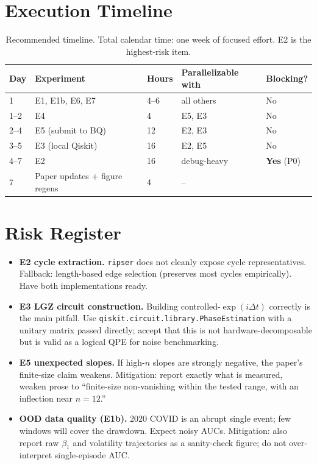 \documentclass[11pt]{article}
\begin{document}
\section{Execution Timeline}

\begin{table}[h]
\centering
\small
\begin{tabular}{lllll}
\toprule
Day & Experiment & Hours & Parallelizable with & Blocking? \\
\midrule
1    & E1, E1b, E6, E7    & 4--6  & all others   & No \\
1--2 & E4                 & 4     & E5, E3       & No \\
2--4 & E5 (submit to BQ)  & 12    & E2, E3       & No \\
3--5 & E3 (local Qiskit)  & 16    & E2, E5       & No \\
4--7 & E2                 & 16    & debug-heavy  & \textbf{Yes} (P0) \\
7    & Paper updates + figure regens & 4 & --    & \\
\bottomrule
\end{tabular}
\caption{Recommended timeline. Total calendar time: one week of
focused effort. E2 is the highest-risk item.}
\end{table}

\section{Risk Register}

\begin{itemize}[leftmargin=*]
  \item \textbf{E2 cycle extraction.} \texttt{ripser} does not cleanly
        expose cycle representatives. Fallback: length-based edge
        selection (preserves most cycles empirically). Have both
        implementations ready.
  \item \textbf{E3 LGZ circuit construction.} Building
        controlled-$\exp(i\Delta t)$ correctly is the main pitfall.
        Use \texttt{qiskit.circuit.library.PhaseEstimation} with a
        unitary matrix passed directly; accept that this is not
        hardware-decomposable but is valid as a logical QPE for
        noise benchmarking.
  \item \textbf{E5 unexpected slopes.} If high-$n$ slopes are
        strongly negative, the paper's finite-size claim weakens.
        Mitigation: report exactly what is measured, weaken prose
        to ``finite-size non-vanishing within the tested range,
        with an inflection near $n = 12$.''
  \item \textbf{OOD data quality (E1b).} 2020 COVID is an abrupt
        single event; few windows will cover the drawdown. Expect
        noisy AUCs. Mitigation: also report raw $\beta_1$ and
        volatility trajectories as a sanity-check figure; do not
        over-interpret single-episode AUC.
\end{itemize}
\end{document}
